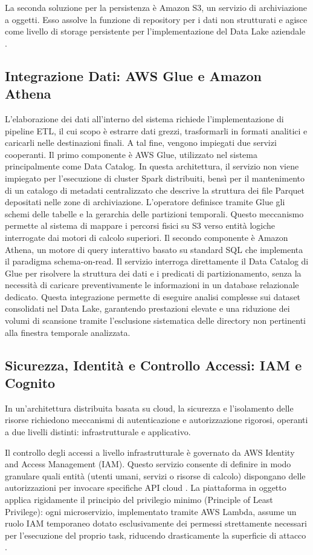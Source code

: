 La seconda soluzione per la persistenza è Amazon S3, un servizio di archiviazione a oggetti. Esso assolve la funzione di repository per i dati non strutturati e agisce come livello di storage persistente per l'implementazione del Data Lake aziendale \cite{S3Doc}.

\subsection{Integrazione Dati: AWS Glue e Amazon Athena}
L'elaborazione dei dati all'interno del sistema richiede l'implementazione di pipeline ETL, il cui scopo è estrarre dati grezzi, trasformarli in formati analitici e caricarli nelle destinazioni finali. A tal fine, vengono impiegati due servizi cooperanti.
Il primo componente è AWS Glue, utilizzato nel sistema principalmente come Data Catalog. In questa architettura, il servizio non viene impiegato per l'esecuzione di cluster Spark \cite{Spark} distribuiti, bensì per il mantenimento di un catalogo di metadati centralizzato che descrive la struttura dei file Parquet \cite{Parquet} depositati nelle zone di archiviazione. L'operatore definisce tramite Glue gli schemi delle tabelle e la gerarchia delle partizioni temporali. Questo meccanismo permette al sistema di mappare i percorsi fisici su S3 verso entità logiche interrogate dai motori di calcolo superiori.
Il secondo componente è Amazon Athena, un motore di query interattivo basato su standard SQL che implementa il paradigma schema-on-read. Il servizio interroga direttamente il Data Catalog di Glue per risolvere la struttura dei dati e i predicati di partizionamento, senza la necessità di caricare preventivamente le informazioni in un database relazionale dedicato. Questa integrazione permette di eseguire analisi complesse sui dataset consolidati nel Data Lake, garantendo prestazioni elevate e una riduzione dei volumi di scansione tramite l'esclusione sistematica delle directory non pertinenti alla finestra temporale analizzata\cite{AWSGlueDoc}.

\subsection{Sicurezza, Identità e Controllo Accessi: IAM e Cognito}
In un'architettura distribuita basata su cloud, la sicurezza e l'isolamento delle risorse richiedono meccanismi di autenticazione e autorizzazione rigorosi, operanti a due livelli distinti: infrastrutturale e applicativo.

Il controllo degli accessi a livello infrastrutturale è governato da AWS Identity and Access Management (IAM). Questo servizio consente di definire in modo granulare quali entità (utenti umani, servizi o risorse di calcolo) dispongano delle autorizzazioni per invocare specifiche API cloud \cite{IAM}. La piattaforma in oggetto applica rigidamente il principio del privilegio minimo (Principle of Least Privilege): ogni microservizio, implementato tramite AWS Lambda, assume un ruolo IAM temporaneo dotato esclusivamente dei permessi strettamente necessari per l'esecuzione del proprio task, riducendo drasticamente la superficie di attacco \cite{LeastPrivilegeCloud}.

